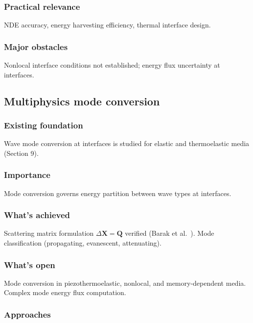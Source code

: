 \subsubsection{Practical relevance}

NDE accuracy, energy harvesting efficiency, thermal interface design.

\subsubsection{Major obstacles}

Nonlocal interface conditions not established; energy flux uncertainty at interfaces.

\subsection{Multiphysics mode conversion}
\label{sec:16.6}

\subsubsection{Existing foundation}

Wave mode conversion at interfaces is studied for elastic and thermoelastic media (Section 9).

\subsubsection{Importance}

Mode conversion governs energy partition between wave types at interfaces.

\subsubsection{What's achieved}

Scattering matrix formulation $\Delta\bm{X}=\bm{Q}$ verified (Barak et al.~\cite{Barak2023}). Mode classification (propagating, evanescent, attenuating).

\subsubsection{What's open}

Mode conversion in piezothermoelastic, nonlocal, and memory-dependent media. Complex mode energy flux computation.

\subsubsection{Approaches}


